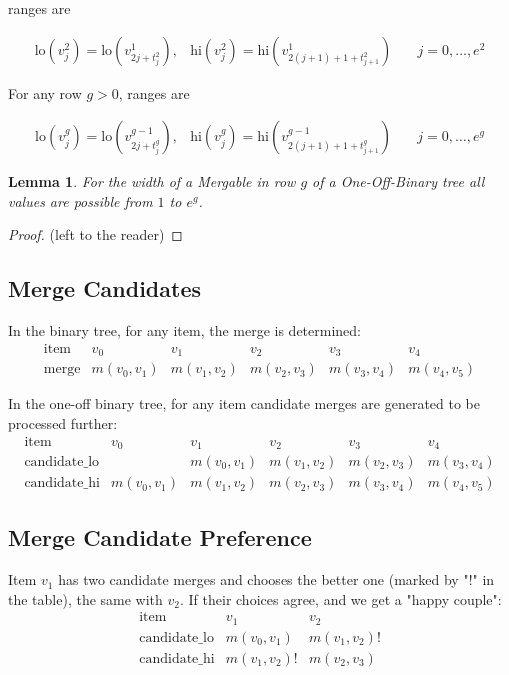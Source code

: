 \documentclass{article}
\theoremstyle{plain}
\newtheorem{lemma}{Lemma}
\begin{document}
ranges are

\begin{align*}
   \text{lo}( v^2_j) = \text{lo}(v^1_{2 j + t^2_j})  , &  \text{hi}( v^2_j) =\text{hi}(v^1_{2(j+1)+1+t^2_{j+1}})   &  \quad j = 0, \dots, e^2
\end{align*}

For any row $g>0$, ranges are

\begin{align*}
   \text{lo}( v^g_j) = \text{lo}(v^{g-1}_{2 j + t^g_j})  , &  \text{hi}( v^g_j) =\text{hi}(v^{g-1}_{2(j+1)+1+t^g_{j+1}})   &  \quad j = 0, \dots, e^g
\end{align*}

\begin{lemma}
For the width of a Mergable in row $g$ of a One-Off-Binary tree all values are possible from $1$  to $ e^g$.
\end{lemma}

\begin{proof}
(left to the reader)
\end{proof}

\subsection*{ Merge Candidates}

In the binary tree, for any item, the merge is determined:
\[
\begin{array}{c|ccccc}
\text{item} & v_0 & v_1 & v_2 & v_3 & v_4 \\
\hline
\text{merge} & m(v_0, v_1) & m(v_1, v_2) & m(v_2, v_3) & m(v_3, v_4) & m(v_4, v_5)
\end{array}
\]

In the one-off binary tree, for any item candidate merges are generated to be processed further:
\[
\begin{array}{c|ccccc}
\text{item} & v_0 & v_1 & v_2 & v_3 & v_4 \\
\hline
\text{candidate\_lo} &   & m(v_0, v_1) & m(v_1, v_2) & m(v_2, v_3) & m(v_3, v_4)  \\
\text{candidate\_hi} & m(v_0, v_1) & m(v_1, v_2) & m(v_2, v_3) & m(v_3, v_4) & m(v_4, v_5)
\end{array}
\]

\subsection*{ Merge Candidate Preference}

Item $v_1$ has two candidate merges and chooses the better one (marked by "!" in the table), the same with $v_2$.
If their choices agree, and we get a "happy couple": 
\[
\begin{array}{c|cc}
\text{item}  & v_1 & v_2 \\
\hline
\text{candidate\_lo} & m(v_0, v_1) & m(v_1, v_2)! \\
\text{candidate\_hi} & m(v_1, v_2)! & m(v_2, v_3) 
\end{array}
\]
\end{document}
